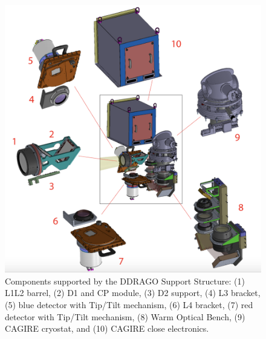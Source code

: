 \documentclass{report}
\begin{document}
\begin{figure}
\centering
\includegraphics[width=1.0\linewidth]{figures/SSsubsystems.png}
\caption{Components supported by the DDRAGO Support Structure: (1) L1L2 barrel, (2) D1 and CP module, (3) D2 support, (4) L3 bracket, (5) blue detector with Tip/Tilt mechanism, (6) L4 bracket, (7) red detector with Tip/Tilt mechanism, (8) Warm Optical Bench, (9) CAGIRE cryostat, and (10) CAGIRE close electronics.}
\label{figure:SSsubsystems}
\end{figure}
\end{document}
